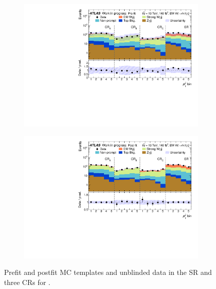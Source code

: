 
\begin{figure}[H]
\centering
\begin{subfigure}[b]{\textwidth}
    \centering
    \includegraphics[width=\textwidth]{plots/diffx/stacks/preFit_stack_jj_pt_WIP_12Feb.pdf}
    \caption{}
\end{subfigure}
\hfill
\begin{subfigure}[b]{\textwidth}
    \centering
    \includegraphics[width=\textwidth]{plots/diffx/stacks/postFit_stack_jj_pt_WIP_12Feb.pdf}
    \caption{}
\end{subfigure}
\caption{Prefit and postfit MC templates and unblinded data in the SR and three CRs for \jjpt.}
\label{fig:jjpt_templates}
\end{figure}

